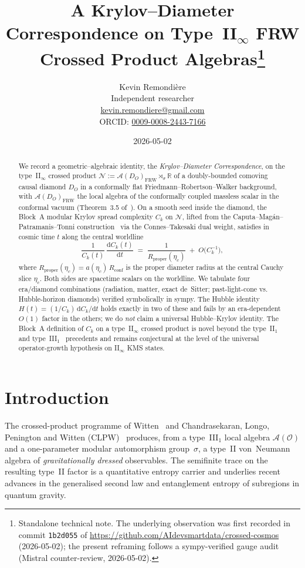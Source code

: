 \documentclass[11pt]{article}
\title{A Krylov--Diameter Correspondence on Type~II$_\infty$ FRW
Crossed Product Algebras\thanks{Standalone technical note. The
underlying observation was first recorded in commit \texttt{1b2d055} of
\url{https://github.com/AIdevsmartdata/crossed-cosmos} (2026-05-02);
the present reframing follows a sympy-verified gauge audit (Mistral
counter-review, 2026-05-02).}}
\author{Kevin Remondi\`ere\\
\small Independent researcher\\
\small \href{mailto:kevin.remondiere@gmail.com}{kevin.remondiere@gmail.com}\\
\small ORCID: \href{https://orcid.org/0009-0008-2443-7166}{0009-0008-2443-7166}}
\date{2026-05-02}
\theoremstyle{definition}
\newcommand{\R}{\mathbb{R}}
\renewcommand{\AA}{\mathcal{A}}
\newcommand{\NN}{\mathcal{N}}
\newcommand{\OO}{\mathcal{O}}
\newcommand{\FRW}{\mathrm{FRW}}
\newcommand{\Rprop}{R_{\mathrm{proper}}}
\newcommand{\Rconf}{R_{\mathrm{conf}}}
\begin{document}
\maketitle

\begin{abstract}
We record a geometric--algebraic identity, the
\emph{Krylov--Diameter Correspondence}, on the type~II$_\infty$
crossed product
$\NN := \AA(D_O)_\FRW \rtimes_\sigma \R$ of a doubly-bounded
comoving causal diamond $D_O$ in a conformally flat
Friedmann--Robertson--Walker background, with $\AA(D_O)_\FRW$ the
local algebra of the conformally coupled massless scalar in the
conformal vacuum (Theorem~3.5 of~\cite{Remondiere2026}). On a smooth
seed inside the diamond, the Block~A modular Krylov spread
complexity $C_k$ on $\NN$, lifted from the
Caputa--Mag\'an--Patramanis--Tonni construction~\cite{CMPT24} via
the Connes--Takesaki dual weight, satisfies in cosmic time $t$
along the central worldline
\[
\frac{1}{C_k(t)}\,\frac{\mathrm{d}C_k(t)}{\mathrm{d}t}
\;=\; \frac{1}{\Rprop(\eta_c)}
\;+\; O\!\big(C_k^{-1}\big),
\]
where $\Rprop(\eta_c) = a(\eta_c)\,\Rconf$ is the proper diameter
radius at the central Cauchy slice $\eta_c$. Both sides are
spacetime scalars on the worldline. We tabulate four
era/diamond combinations (radiation, matter, exact de~Sitter; past-light-cone vs. Hubble-horizon diamonds) verified symbolically in
sympy. The Hubble identity $H(t)=(1/C_k)\,\mathrm{d}C_k/\mathrm{d}t$
holds exactly in two of these and fails by an era-dependent $O(1)$
factor in the others; we do \emph{not} claim a universal
Hubble--Krylov identity. The Block~A definition of $C_k$ on a
type~II$_\infty$ crossed product is novel beyond the
type~II$_1$~\cite{AguilarGutierrez2025} and
type~III$_1$~\cite{CMPT24} precedents and remains conjectural at the
level of the universal operator-growth hypothesis on II$_\infty$
KMS states.
\end{abstract}

\section{Introduction}\label{sec:intro}

The crossed-product programme of Witten~\cite{Witten2022} and
Chandrasekaran, Longo, Penington and Witten
(CLPW)~\cite{CLPW2023} produces, from a type~III$_1$ local algebra
$\AA(\OO)$ and a one-parameter modular automorphism group~$\sigma$,
a type~II von~Neumann algebra of \emph{gravitationally dressed}
observables. The semifinite trace on the resulting type~II factor
is a quantitative entropy carrier and underlies recent advances in
the generalised second law and entanglement entropy of subregions
in quantum gravity.
\end{document}
